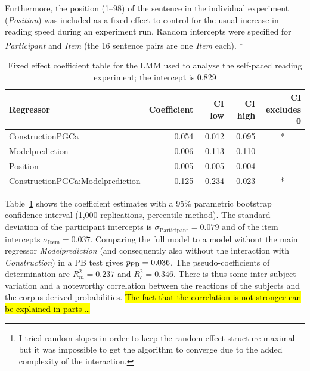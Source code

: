 Furthermore, the position (1--98) of the sentence in the individual experiment (\textit{Position}) was included as a fixed effect to control for the usual increase in reading speed during an experiment run.
Random intercepts were specified for \textit{Participant} and \textit{Item} (the 16 sentence pairs are one \textit{Item} each).%
\footnote{I tried random slopes in order to keep the random effect structure maximal \citep{BarrEa2013} but it was impossible to get the algorithm to converge due to the added complexity of the interaction.}

\begin{table}
  \centering
  \begin{tabular}{lrrrc}
    Regressor & \multicolumn{1}{r}{Coefficient} & \multicolumn{1}{r}{CI low} & \multicolumn{1}{r}{CI high} & \multicolumn{1}{r}{CI excludes 0} \\ \midrule
    ConstructionPGCa                 &  0.054 &  0.012 &  0.095 &  *  \\ 
    Modelprediction                  & -0.006 & -0.113 &  0.110 &     \\ 
    Position                         & -0.005 & -0.005 &  0.004 &     \\ 
    ConstructionPGCa:Modelprediction & -0.125 & -0.234 & -0.023 &  *  \\ 
  \end{tabular}
  \caption{Fixed effect coefficient table for the LMM used to analyse the self-paced reading experiment; the intercept is 0.829}
  \label{tab:exp:spr}
\end{table}

Table~\ref{tab:exp:spr} shows the coefficient estimates with a 95\% parametric bootstrap confidence interval (1,000 replications, percentile method).
The standard deviation of the participant intercepts is $\sigma_{\text{Participant}}=0.079$ and of the item intercepts $\sigma_{\text{Item}}=0.037$.
Comparing the full model to a model without the main regressor \textit{Modelprediction} (and consequently also without the interaction with \textit{Construction}) in a PB test gives $p_{\text{PB}}=0.036$.
The pseudo-coefficients of determination are $R^2_m=0.237$ and $R^2_c=0.346$.
There is thus some inter-subject variation and a noteworthy correlation between the reactions of the subjects and the corpus-derived probabilities.
\hl{The fact that the correlation is not stronger can be explained in parts \ldots}

